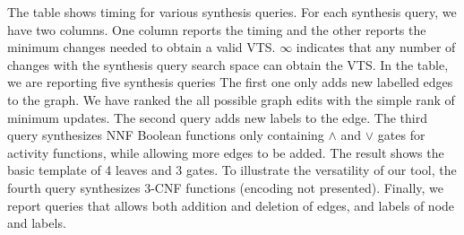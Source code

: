 \begin{enumerate}
The table shows timing for various synthesis queries.
%
For each synthesis query, we have two columns.
%
One column reports the timing and the other reports the minimum changes
needed to obtain a valid VTS.
%
$\infty$ indicates that any number of changes with the synthesis query
search space can obtain the VTS.
%
In the table, we are reporting five synthesis queries
%
The first one only adds new labelled edges to the graph.
%
We have ranked the all possible graph edits with the simple rank of
minimum updates.
%
The second query adds new labels to the edge.
%
The third query synthesizes NNF Boolean functions only containing
$\land$ and $\lor$ gates for activity functions, while allowing
more edges to be added.
%
The result shows the basic template of 4 leaves and 3 gates.
%
%
To illustrate the versatility of our tool, the fourth query
synthesizes $3$-CNF functions (encoding not presented).
%
Finally, we report queries that allows both addition and deletion of edges, and labels
of node and labels. 

\end{enumerate}

%
%

